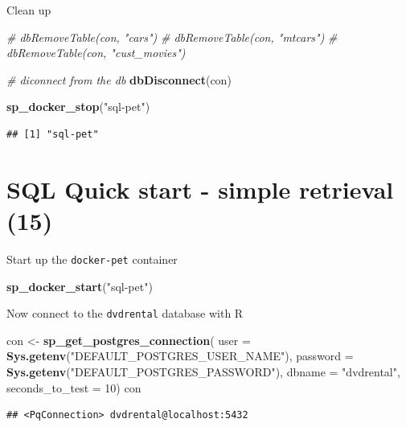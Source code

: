 \documentclass[]{book}
\newenvironment{Shaded}{\begin{snugshade}}{\end{snugshade}}
\newcommand{\CommentTok}[1]{\textcolor[rgb]{0.56,0.35,0.01}{\textit{#1}}}
\newcommand{\DataTypeTok}[1]{\textcolor[rgb]{0.13,0.29,0.53}{#1}}
\newcommand{\DecValTok}[1]{\textcolor[rgb]{0.00,0.00,0.81}{#1}}
\newcommand{\KeywordTok}[1]{\textcolor[rgb]{0.13,0.29,0.53}{\textbf{#1}}}
\newcommand{\NormalTok}[1]{#1}
\newcommand{\StringTok}[1]{\textcolor[rgb]{0.31,0.60,0.02}{#1}}
\theoremstyle{definition}
\theoremstyle{definition}
\theoremstyle{definition}
\theoremstyle{remark}
\begin{document}
Clean up

\begin{Shaded}
\begin{Highlighting}[]
\CommentTok{# dbRemoveTable(con, "cars")}
\CommentTok{# dbRemoveTable(con, "mtcars")}
\CommentTok{# dbRemoveTable(con, "cust_movies")}

\CommentTok{# diconnect from the db}
\KeywordTok{dbDisconnect}\NormalTok{(con)}

\KeywordTok{sp_docker_stop}\NormalTok{(}\StringTok{"sql-pet"}\NormalTok{)}
\end{Highlighting}
\end{Shaded}

\begin{verbatim}
## [1] "sql-pet"
\end{verbatim}

\hypertarget{sql-quick-start---simple-retrieval-15}{%
\chapter{SQL Quick start - simple retrieval
(15)}\label{sql-quick-start---simple-retrieval-15}}

Start up the \texttt{docker-pet} container

\begin{Shaded}
\begin{Highlighting}[]
\KeywordTok{sp_docker_start}\NormalTok{(}\StringTok{"sql-pet"}\NormalTok{)}
\end{Highlighting}
\end{Shaded}

Now connect to the \texttt{dvdrental} database with R

\begin{Shaded}
\begin{Highlighting}[]
\NormalTok{con <-}\StringTok{ }\KeywordTok{sp_get_postgres_connection}\NormalTok{(}
  \DataTypeTok{user =} \KeywordTok{Sys.getenv}\NormalTok{(}\StringTok{"DEFAULT_POSTGRES_USER_NAME"}\NormalTok{),}
  \DataTypeTok{password =}  \KeywordTok{Sys.getenv}\NormalTok{(}\StringTok{"DEFAULT_POSTGRES_PASSWORD"}\NormalTok{),}
  \DataTypeTok{dbname =} \StringTok{"dvdrental"}\NormalTok{,}
  \DataTypeTok{seconds_to_test =} \DecValTok{10}\NormalTok{)}
\NormalTok{con}
\end{Highlighting}
\end{Shaded}

\begin{verbatim}
## <PqConnection> dvdrental@localhost:5432
\end{verbatim}
\end{document}
